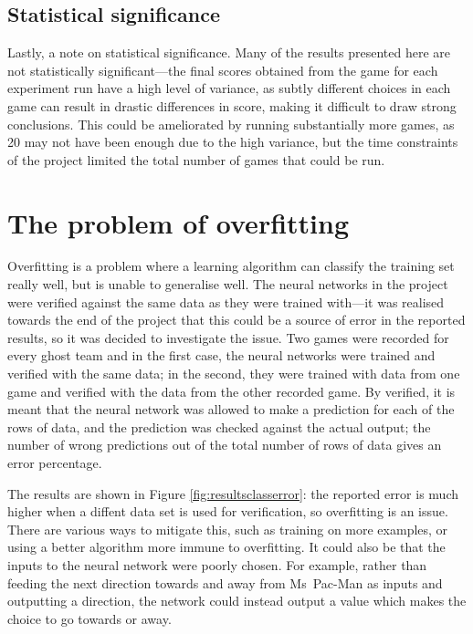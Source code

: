 \subsection{Statistical significance}

Lastly, a note on statistical significance.  Many of the results presented here are not statistically significant---the final scores obtained from the game for each experiment run have a high level of variance, as subtly different choices in each game can result in drastic differences in score, making it difficult to draw strong conclusions.  This could be ameliorated by running substantially more games, as 20 may not have been enough due to the high variance, but the time constraints of the project limited the total number of games that could be run.

\section{The problem of overfitting}
\label{sec:overfitting}

Overfitting is a problem where a learning algorithm can classify the training set really well, but is unable to generalise well.  The neural networks in the project were verified against the same data as they were trained with---it was realised towards the end of the project that this could be a source of error in the reported results, so it was decided to investigate the issue.  Two games were recorded for every ghost team and in the first case, the neural networks were trained and verified with the same data; in the second, they were trained with data from one game and verified with the data from the other recorded game.  By verified, it is meant that the neural network was allowed to make a prediction for each of the rows of data, and the prediction was checked against the actual output; the number of wrong predictions out of the total number of rows of data gives an error percentage.

The results are shown in Figure \ref{fig:resultsclasserror}: the reported error is much higher when a diffent data set is used for verification, so overfitting is an issue.  There are various ways to mitigate this, such as training on more examples, or using a better algorithm more immune to overfitting.  It could also be that the inputs to the neural network were poorly chosen.  For example, rather than feeding the next direction towards and away from Ms~Pac-Man as inputs and outputting a direction, the network could instead output a value which makes the choice to go towards or away.

